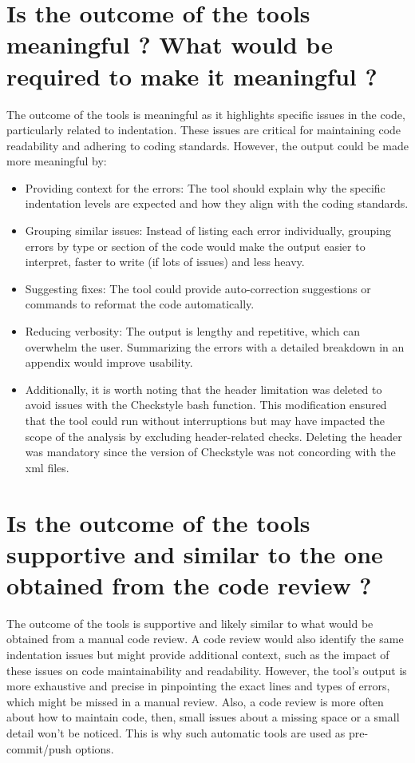 \documentclass[twocolumn,10pt]{article}
\begin{document}
\section{Is the outcome of the tools meaningful ? What would be required to make it meaningful ?}

The outcome of the tools is meaningful as it highlights specific issues in the code, particularly related to indentation. These issues are critical for maintaining code readability and adhering to coding standards. However, the output could be made more meaningful by:

\begin{itemize}[itemsep=0pt, topsep=0pt, parsep=0pt, partopsep=0pt]
    \item Providing context for the errors: The tool should explain why the specific indentation levels are expected and how they align with the coding standards.
    \item Grouping similar issues: Instead of listing each error individually, grouping errors by type or section of the code would make the output easier to interpret, faster to write (if lots of issues) and less heavy.
    \item Suggesting fixes: The tool could provide auto-correction suggestions or commands to reformat the code automatically. 
    \item Reducing verbosity: The output is lengthy and repetitive, which can overwhelm the user. Summarizing the errors with a detailed breakdown in an appendix would improve usability.
    \item Additionally, it is worth noting that the header limitation was deleted to avoid issues with the Checkstyle bash function. This modification ensured that the tool could run without interruptions but may have impacted the scope of the analysis by excluding header-related checks. Deleting the header was mandatory since the version of Checkstyle was not concording with the xml files.
\end{itemize}

\section{Is the outcome of the tools supportive and similar to the one obtained from the code review ?}
The outcome of the tools is supportive and likely similar to what would be obtained from a manual code review. A code review would also identify the same indentation issues but might provide additional context, such as the impact of these issues on code maintainability and readability. However, the tool's output is more exhaustive and precise in pinpointing the exact lines and types of errors, which might be missed in a manual review. Also, a code review is more often about how to maintain code, then, small issues about a missing space or a small detail won't be noticed. This is why such automatic tools are used as pre-commit/push options. 
\end{document}
